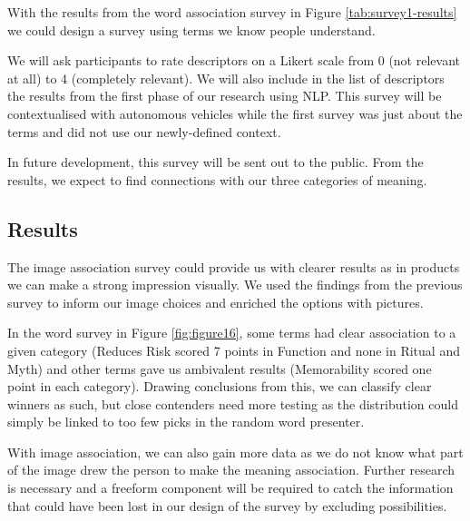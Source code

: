 \documentclass[12pt, usenames, dvipsnames]{report}
\begin{document}
\begin{flushleft}
With the results from the word association survey in Figure \ref{tab:survey1-results} we could design a survey using terms we know people understand.

We will ask participants to rate descriptors on a Likert scale from 0 (not relevant at all) to 4 (completely relevant).
We will also include in the list of descriptors the results from the first phase of our research using NLP.
This survey will be contextualised with autonomous vehicles while the first survey was just about the terms and did not use our newly-defined context.


In future development, this survey will be sent out to the public.
From the results, we expect to find connections with our three categories of meaning.


\subsection{Results}

The image association survey could provide us with clearer results as in products we can make a strong impression visually.
We used the findings from the previous survey to inform our image choices and enriched the options with pictures.


In the word survey in Figure \ref{fig:figure16}, some terms had clear association to a given category (Reduces Risk scored 7 points in Function and none in Ritual and Myth) and other terms gave us ambivalent results (Memorability scored one point in each category).
Drawing conclusions from this, we can classify clear winners as such, but close contenders need more testing as the distribution could simply be linked to too few picks in the random word presenter.

With image association, we can also gain more data as we do not know what part of the image drew the person to make the meaning association. 
Further research is necessary and a freeform component will be required to catch the information that could have been lost in our design of the survey by excluding possibilities.


\end{flushleft}
\end{document}
